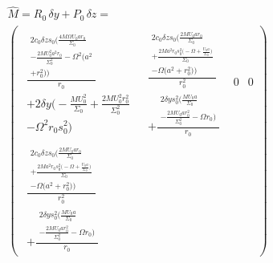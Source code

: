 \documentclass[english]{article}
\begin{document}
\begin{align*}
 & \hat{M}=R_{0}\,\delta y+P_{0}\,\delta z=\\
 & \begin{pmatrix}\begin{gathered}\frac{\begin{gathered}2c_{0}\delta zs_{0}\biggl(\frac{4M\Omega U_{0}ar_{0}}{\Sigma_{0}}\\
-\frac{2MU^{2}_{0}a^{2}r_{0}}{\Sigma^{2}_{0}}-\Omega^{2}\biggl(a^{2}\\
+r^{2}_{0}\biggr)\biggr)
\end{gathered}
}{r_{0}}\\
+2\delta y\biggl(-\frac{MU^{2}_{0}}{\Sigma_{0}}+\frac{2MU^{2}_{0}r^{2}_{0}}{\Sigma^{2}_{0}}\\
-\Omega^{2}r_{0}s^{2}_{0}\biggr)
\end{gathered}
 & \begin{gathered}\frac{\begin{gathered}2c_{0}\delta zs_{0}\biggl(\frac{2MU_{0}ar_{0}}{\Sigma_{0}}\\
+\frac{2Ma^{2}r_{0}s^{2}_{0}\biggl(-\Omega+\frac{U_{0}a}{\Sigma_{0}}\biggr)}{\Sigma_{0}}\\
-\Omega\biggl(a^{2}+r^{2}_{0}\biggr)\biggr)
\end{gathered}
}{r^{2}_{0}}\\
+\frac{\begin{gathered}2\delta ys^{2}_{0}\biggl(\frac{MU_{0}a}{\Sigma_{0}}\\
-\frac{2MU_{0}ar^{2}_{0}}{\Sigma^{2}_{0}}-\Omega r_{0}\biggr)
\end{gathered}
}{r_{0}}
\end{gathered}
 & 0 & 0\\
\begin{gathered}\frac{\begin{gathered}2c_{0}\delta zs_{0}\biggl(\frac{2MU_{0}ar_{0}}{\Sigma_{0}}\\
+\frac{2Ma^{2}r_{0}s^{2}_{0}\biggl(-\Omega+\frac{U_{0}a}{\Sigma_{0}}\biggr)}{\Sigma_{0}}\\
-\Omega\biggl(a^{2}+r^{2}_{0}\biggr)\biggr)
\end{gathered}
}{r^{2}_{0}}\\
+\frac{\begin{gathered}2\delta ys^{2}_{0}\biggl(\frac{MU_{0}a}{\Sigma_{0}}\\
-\frac{2MU_{0}ar^{2}_{0}}{\Sigma^{2}_{0}}-\Omega r_{0}\biggr)
\end{gathered}
}{r_{0}}
\end{gathered}

\end{pmatrix}
\end{align*}
\end{document}

